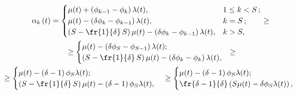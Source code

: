 \begin{multline*}

    \alpha_{k}\left( t\right) =

    \begin{cases}

        \mu(t) +\left(\phi_{k-1} -\phi_k\right)\lambda(t), & 1 \le k < S\,;\\

        \mu(t) -\left(\delta\phi_k-\phi_{k-1}\right)\lambda(t), & k = S\,;\\

        \left(S-\fr{1}{\delta}\,S\right)\mu(t) -\left(\delta\phi_{k}-

\phi_{k-1}\right)\lambda(t), & k > S,\\

    \end{cases} \ge{}


\\

   {} \ge

    \begin{cases}

        \mu(t) -\left(\delta\phi_S-\phi_{S-1}\right)\lambda(t);\\

        \left(S-\fr{1}{\delta}\,S\right)\mu(t) -\left(\delta\phi_{k}-\phi_{k}\right)\lambda(t), \\

    \end{cases}\!\!

\ge{}\\

{}\ge

\begin{cases}

    \mu(t) -\left(\delta-1\right)\phi_S\lambda(t);\\

    \left(S-\fr{1}{\delta}\,S\right)\mu(t) -\left(\delta-1\right)\phi_{S}\lambda(t), \\

\end{cases} \ge

    \begin{cases}

        \mu(t) -\left(\delta-1\right)\phi_S\lambda(t);\\

        \fr{\delta-1}{\delta}\left(S\mu(t)-\delta\phi_S\lambda(t)\right), 

    \end{cases}


\end{multline*}


